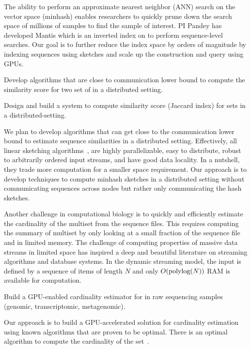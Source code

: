The ability to perform an approximate nearest neighbor (ANN) search on the vector space (minhash) enables researchers to quickly prune down the search space of millions of samples to find the sample of interest. PI Pandey has developed Mantis which is an inverted index on \kmers to perform sequence-level searches. Our goal is to further reduce the index space by orders of magnitude by indexing sequences using sketches and scale up the construction and query using GPUs.

\begin{rproblem}
Develop algorithms that are close to communication lower bound to compute the similarity score for two set of \kmers in a distributed setting.
\end{rproblem}

\begin{rproblem}
Design and build a system to compute similarity score (Jaccard index) for \kmer sets in a distributed-setting.
\end{rproblem}

We plan to develop algorithms that can get close to the communication lower bound to estimate sequence similarities in a distributed setting. Effectively, all linear sketching algorithms~\cite{li2014sketchuniversal}, are highly parallelizable, easy to distribute, robust to arbitrarily ordered input streams, and have good data locality. In a nutshell, they trade more computation for a smaller space requirement. Our approach is to develop techniques to compute minhash sketches in a distributed setting without communicating sequences across nodes but rather only communicating the hash sketches.

Another challenge in computational biology is to quickly and efficiently estimate the cardinality of the \kmer multiset from the sequence files. This requires computing the summary of \kmer multiset by only looking at a small fraction of the sequence file and in limited memory.
%
The challenge of computing properties of massive data streams in limited space has inspired a deep and beautiful literature on streaming algorithms and database systems. In the dynamic streaming model, the input is defined by a sequence of items of length $N$ and only $O(\textrm{polylog}{(N)})$ {RAM} is available for computation.


\begin{rproblem}
Build a GPU-enabled cardinality estimator for \kmers in raw sequencing samples (genomic, transcriptomic, metagenomic).
\end{rproblem}


Our approach is to build a GPU-accelerated solution for cardinality estimation using known algorithms that are proven to be optimal. There is an optimal algorithm to compute the cardinality of the set~\cite{Kane2010}.
